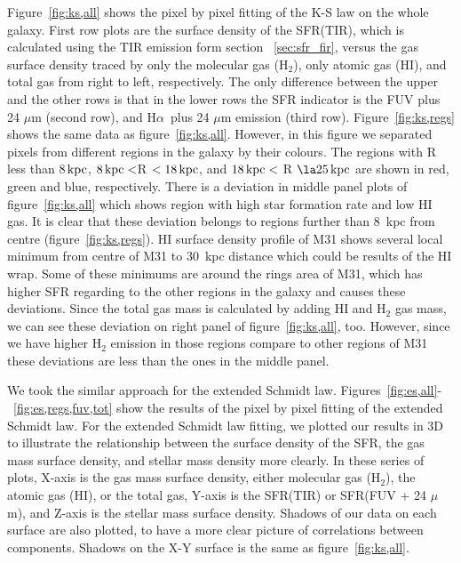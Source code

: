 \documentclass[useAMS,usenatbib]{mn2e}
\newcommand \kpc        {\,{\rm kpc}}
\newcommand \halpha    {H$\alpha $\ }
\begin{document}
Figure~\ref{fig:ks,all} shows the pixel by pixel fitting of the K-S law on the whole galaxy. First row plots are the surface density of the SFR(TIR), which is calculated using  the TIR emission form section ~\ref{sec:sfr_fir}, versus the gas surface density traced by only the molecular gas (H$_2$),  only atomic gas (HI), and total gas from right to left, respectively. The only difference between the upper and the other rows is that in the lower rows the SFR indicator is the FUV plus 24 $\mu$m (second row), and \halpha plus 24 $\mu$m emission (third row). Figure~\ref{fig:ks,regs} shows the same data as figure~\ref{fig:ks,all}. However, in this figure we separated pixels from different regions in the galaxy by their colours. The regions with R less than 8$\kpc$, $8\kpc < $R $< 18\kpc$, and $18\kpc <$ R $\la 25\kpc$ are shown in red, green and blue, respectively. There is a deviation in middle panel plots of figure~\ref{fig:ks,all} which shows region with high star formation rate and low HI gas. It is clear that these deviation belongs to regions further than 8~kpc from centre (figure~\ref{fig:ks,regs}). HI surface density profile of M31 \citep[See figure 16 in.][]{Chemin09} shows several local minimum from centre of M31 to 30~kpc distance which could be results of the HI wrap. Some of these minimums are around the rings area of M31, which has higher SFR regarding to the other regions in the galaxy and causes these deviations. Since the total gas mass is calculated by adding HI and H$_2$ gas mass, we can see these deviation on right panel of figure~\ref{fig:ks,all}, too. However, since we have higher H$_2$ emission in those regions compare to other regions of M31 these deviations are less than the ones in the middle panel.  

We took the similar approach for the extended Schmidt law. Figures~\ref{fig:es,all}-~\ref{fig:es,regs,fuv,tot} show the results of the pixel by pixel fitting of the extended Schmidt law. For the extended Schmidt law fitting, we plotted our results in 3D to illustrate the relationship between the surface density of the SFR, the gas mass surface density, and stellar mass density more clearly. In these series of plots, X-axis is the gas mass surface density, either molecular gas (H$_2$), the atomic gas (HI), or the total gas, Y-axis is the SFR(TIR) or SFR(FUV + 24 $\mu$m), and Z-axis is the stellar mass surface density. Shadows of our data on each surface are also plotted, to have a more clear picture of correlations between components. Shadows on the X-Y surface is the same as figure~\ref{fig:ks,all}. 
\end{document}
